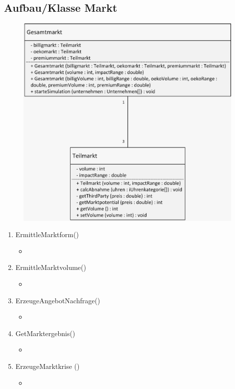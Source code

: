 \subsection{Aufbau/Klasse Markt}
\begin{figure} [!h]
	\centering
	\includegraphics[scale=0.9]{img/Markt.png} 
\end{figure}
\begin{enumerate}
	\item ErmittleMarktform() 
	\begin{itemize}
	\item	
	\end{itemize}
	\item ErmittleMarktvolume() 
	\begin{itemize}
	\item 	
	\end{itemize}
	\item ErzeugeAngebotNachfrage() 
	\begin{itemize}
	\item 	
	\end{itemize}
	\item GetMarktergebnis() 
	\begin{itemize}
	\item 	
	\end{itemize}
	\item ErzeugeMarktkrise () 
	\begin{itemize}
	\item 	
	\end{itemize}
\end{enumerate}




